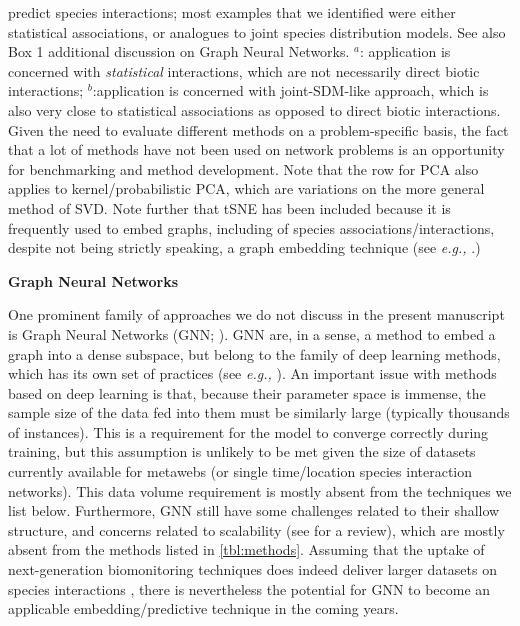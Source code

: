 \begin{table}[h!]
{predict species interactions; most examples that we identified were
either statistical associations, or analogues to joint species
distribution models. See also Box 1 additional discussion on Graph Neural Networks. \(^a\): application is concerned with
\emph{statistical} interactions, which are not necessarily direct
biotic interactions; \(^b\):application is concerned with joint-SDM-like
approach, which is also very close to statistical associations as
opposed to direct biotic interactions. Given the need to evaluate
different methods on a problem-specific basis, the fact that a lot of
methods have not been used on network problems is an opportunity for
benchmarking and method development. Note that the row for PCA also
applies to kernel/probabilistic PCA, which are variations on the more
general method of SVD. Note further that tSNE has been included because
it is frequently used to embed graphs, including of species
associations/interactions, despite not being strictly speaking, a graph
embedding technique (see \emph{e.g.,} \cite{Chami2022Machine}.)}
\label{tbl:methods}
\end{table}

\begin{summary}
\textbf{Graph Neural Networks}

One prominent family of approaches we do not discuss in the present
manuscript is Graph Neural Networks (GNN; \cite{Zhou2020Graph}). GNN are,
in a sense, a method to embed a graph into a dense subspace, but belong
to the family of deep learning methods, which has its own set of
practices (see \emph{e.g.,} \cite{Goodfellow2016Deep}). An important issue with
methods based on deep learning is that, because their parameter space is
immense, the sample size of the data fed into them must be similarly
large (typically thousands of instances). This is a requirement for the
model to converge correctly during training, but this assumption is
unlikely to be met given the size of datasets currently available for
metawebs (or single time/location species interaction networks). This
data volume requirement is mostly absent from the techniques we list
below. Furthermore, GNN still have some challenges related to their
shallow structure, and concerns related to scalability (see
\cite{Gupta2021Graph} for a review), which are mostly absent from the
methods listed in \autoref{tbl:methods}. Assuming that the uptake of
next-generation biomonitoring techniques does indeed deliver larger
datasets on species interactions \cite{Bohan2017Nextgeneration}, there
is nevertheless the potential for GNN to become an applicable
embedding/predictive technique in the coming years.
\end{summary}

